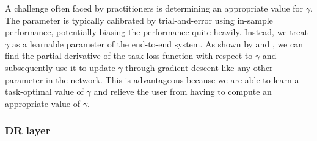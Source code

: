 \documentclass[10pt, twocolumn]{article}
\theoremstyle{plain}
\theoremstyle{definition}
\begin{document}
A challenge often faced by practitioners is determining an appropriate
value for \(\gamma\). The parameter is typically calibrated by
trial-and-error using in-sample performance, potentially biasing the
performance quite heavily. Instead, we treat \(\gamma\) as a learnable 
parameter of the end-to-end system. As shown by \cite{amos2017optnet} 
and \citet{agrawal2019differentiable}, we can find the partial derivative 
of the task loss function with respect to \(\gamma\) and subsequently 
use it to update \(\gamma\) through gradient descent like any other 
parameter in the network. This is advantageous because we are able to learn
a task-optimal value of \(\gamma\) and relieve the user from
having to compute an appropriate value of \(\gamma\).

\subsubsection{DR layer}\label{sec:dr_layer}
\end{document}
